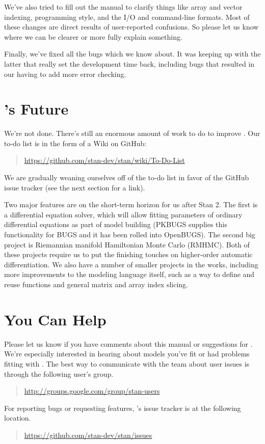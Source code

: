 We've also tried to fill out the manual to clarify things like array
and vector indexing, programming style, and the I/O and command-line
formats.  Most of these changes are direct results of user-reported
confusions.  So please let us know where we can be clearer or more
fully explain something.

Finally, we've fixed all the bugs which we know about.  It was keeping
up with the latter that really set the development time back,
including bugs that resulted in our having to add more error checking.


\section*{\Stan's Future}

We're not done. There's still an enormous amount of work to do to
improve \Stan.  Our to-do list is in the form of a Wiki on GitHub:
%
\begin{quote}
\url{https://github.com/stan-dev/stan/wiki/To-Do-List}
\end{quote}
%
We are gradually weaning ourselves off of the to-do list in favor of
the GitHub issue tracker (see the next section for a link).

Two major features are on the short-term horizon for us after Stan
2.  The first is a differential equation solver, which will allow
fitting parameters of ordinary differential equations as part of model
building (PKBUGS supplies this functionality for BUGS and it has been
rolled into OpenBUGS).  The second big project is Riemannian manifold
Hamiltonian Monte Carlo (RMHMC).  Both of these projects require us to
put the finishing touches on higher-order automatic differentiation.
We also have a number of smaller projects in the works, including more
improvements to the modeling language itself, such as a way to define
and reuse functions and general matrix and array index slicing.

\section*{You Can Help}

Please let us know if you have comments about this manual or
suggestions for \Stan.  We're especially interested in hearing about
models you've fit or had problems fitting with \Stan.  The best way to
communicate with the \Stan team about user issues is through the
following user's group.
%
\begin{quote}
\url{http://groups.google.com/group/stan-users}
\end{quote}
%
For reporting bugs or requesting features, \Stan's issue tracker is at
the following location.
%
\begin{quote}
\url{https://github.com/stan-dev/stan/issues}
\end{quote}

